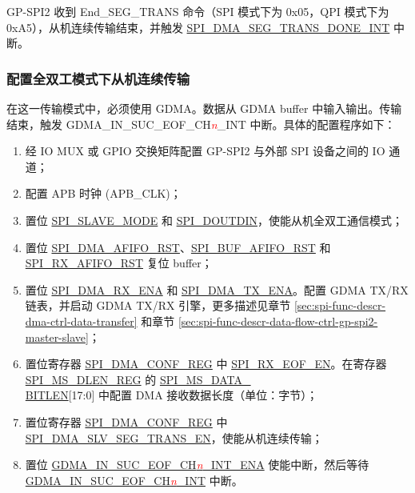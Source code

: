 \documentclass[main\_\_CN.tex]{subfiles}
\begin{document}
GP-SPI2 收到 End\_SEG\_TRANS 命令（SPI 模式下为 0x05，QPI 模式下为 0xA5），从机连续传输结束，并触发 \hyperref[int:SPIDMASEGTRANSDONEINT]{SPI\_DMA\_SEG\_TRANS\_DONE\_INT} 中断。

\subsubsection{配置全双工模式下从机连续传输}\label{sec:spi-config-slave-seg-trans-full-duplex}
在这一传输模式中，必须使用 GDMA。数据从 GDMA buffer 中输入输出。传输结束，触发 GDMA\_IN\_SUC\_EOF\_CH\textcolor{red}{\it{n}}\_INT  中断。具体的配置程序如下：

\begin{enumerate}
   \item 经 IO MUX 或 GPIO 交换矩阵配置 GP-SPI2 与外部 SPI 设备之间的 IO 通道；
   \item 配置 APB 时钟 (APB\_CLK)；

    \item 置位 \hyperref[fielddesc:SPISLAVEMODE]{SPI\_SLAVE\_MODE} 和 \hyperref[fielddesc:SPIDOUTDIN]{SPI\_DOUTDIN}，使能从机全双工通信模式；

    \item 置位 \hyperref[fielddesc:SPIDMAAFIFORST]{SPI\_DMA\_AFIFO\_RST}、\hyperref[fielddesc:SPIBUFAFIFORST]{SPI\_BUF\_AFIFO\_RST} 和 \hyperref[fielddesc:SPIRXAFIFORST]{SPI\_RX\_AFIFO\_RST} 复位 buffer；

    \item 置位 \hyperref[fielddesc:SPIDMARXENA]{SPI\_DMA\_RX\_ENA} 和 \hyperref[fielddesc:SPIDMATXENA]{SPI\_DMA\_TX\_ENA}。配置 GDMA TX/RX 链表，并启动 GDMA TX/RX 引擎，更多描述见章节 \ref{sec:spi-func-descr-dma-ctrl-data-transfer} 和章节 \ref{sec:spi-func-descr-data-flow-ctrl-gp-spi2-master-slave}；

    \item 置位寄存器 \hyperref[regdesc:SPIDMACONFREG]{SPI\_DMA\_CONF\_REG} 中 \hyperref[fielddesc:SPIRXEOFEN]{SPI\_RX\_EOF\_EN}。在寄存器 \hyperref[regdesc:SPIMSDLENREG]{SPI\_MS\_DLEN\_REG} 的 \hyperref[fielddesc:SPIMSDATABITLEN]{SPI\_MS\_DATA\_\\BITLEN}[17:0] 中配置 DMA 接收数据长度（单位：字节）；

    \item 置位寄存器 \hyperref[regdesc:SPIDMACONFREG]{SPI\_DMA\_CONF\_REG} 中 \hyperref[fielddesc:SPIDMASLVSEGTRANSEN]{SPI\_DMA\_SLV\_SEG\_TRANS\_EN}，使能从机连续传输；

    \item 置位 \hyperref[fielddesc:GDMAINSUCEOFCHNINTENA]{GDMA\_IN\_SUC\_EOF\_CH\textcolor{red}{\it{n}}\_INT\_ENA}  使能中断，然后等待 \hyperref[int:GDMAINSUCEOFINT]{GDMA\_IN\_SUC\_EOF\_CH\textcolor{red}{\it{n}}\_INT} 中断。
\end{enumerate}
\end{document}

